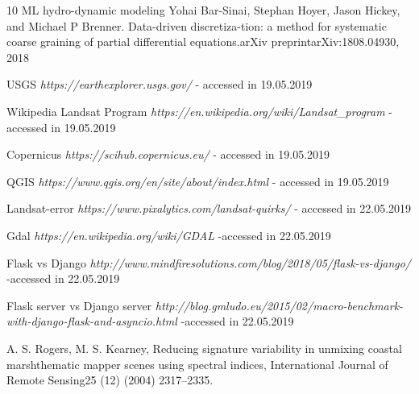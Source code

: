 \documentclass[12pt, a4paper]{report}
\begin{document}
\begin{thebibliography} {10}
ML hydro-dynamic modeling
Yohai Bar-Sinai, Stephan Hoyer, Jason Hickey, and Michael P Brenner. Data-driven discretiza-tion: a method for systematic coarse graining of partial differential equations.arXiv preprintarXiv:1808.04930, 2018


USGS \textit{https://earthexplorer.usgs.gov/} - accessed in 19.05.2019


Wikipedia Landsat Program \textit{https://en.wikipedia.org/wiki/Landsat\_program} - accessed in 19.05.2019

Copernicus \textit{https://scihub.copernicus.eu/} - accessed in 19.05.2019

QGIS \textit{https://www.qgis.org/en/site/about/index.html} - accessed in 19.05.2019

Landsat-error \textit{https://www.pixalytics.com/landsat-quirks/} - accessed in 22.05.2019

Gdal \textit{https://en.wikipedia.org/wiki/GDAL} -accessed in 22.05.2019

Flask vs Django \textit{http://www.mindfiresolutions.com/blog/2018/05/flask-vs-django/} -accessed in 22.05.2019

Flask server vs Django server \textit{http://blog.gmludo.eu/2015/02/macro-benchmark-with-django-flask-and-asyncio.html} -accessed in 22.05.2019

A. S. Rogers, M. S. Kearney, Reducing signature variability in unmixing coastal marshthematic mapper scenes using spectral indices, International Journal of Remote Sensing25 (12) (2004) 2317–2335.






\end{thebibliography}






\end{document}
